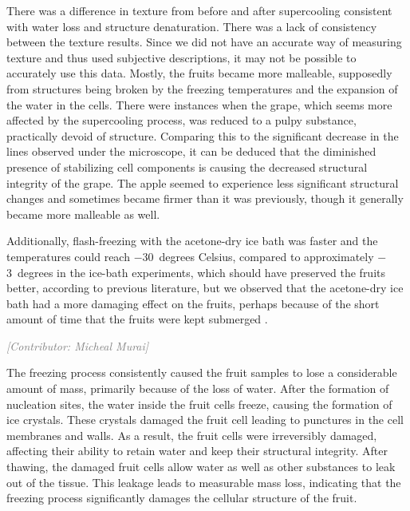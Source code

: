 \documentclass[12pt, a4paper]{article}
\newcommand{\contributor}[1]{\vspace{4pt}\noindent\textcolor{gray}{\small\textit{[Contributor: #1]}}\vspace{2pt}}
\begin{document}
There was a difference in texture from before and after supercooling
consistent with water loss and structure denaturation. There was a lack
of consistency between the texture results. Since we did not have an
accurate way of measuring texture and thus used subjective descriptions,
it may not be possible to accurately use this data. Mostly, the fruits
became more malleable, supposedly from structures being broken by the
freezing temperatures and the expansion of the water in the cells. There
were instances when the grape, which seems more affected by the
supercooling process, was reduced to a pulpy substance, practically
devoid of structure. Comparing this to the significant decrease in the
lines observed under the microscope, it can be deduced that the
diminished presence of stabilizing cell components is causing the
decreased structural integrity of the grape. The apple seemed to
experience less significant structural changes and sometimes became
firmer than it was previously, though it generally became more malleable
as well.

Additionally, flash-freezing with the acetone-dry ice bath was faster
and the temperatures could reach $-$30~degrees Celsius, compared to
approximately $-$3~degrees in the ice-bath experiments, which should have
preserved the fruits better, according to previous literature, but we
observed that the acetone-dry ice bath had a more damaging effect on the
fruits, perhaps because of the short amount of time that the fruits were
kept submerged \cite{narayana2023}.

\contributor{Micheal Murai}

The freezing process consistently caused the fruit samples to lose a
considerable amount of mass, primarily because of the loss of water.
After the formation of nucleation sites, the water inside the fruit
cells freeze, causing the formation of ice crystals. These crystals
damaged the fruit cell leading to punctures in the cell membranes and
walls. As a result, the fruit cells were irreversibly damaged, affecting
their ability to retain water and keep their structural integrity. After
thawing, the damaged fruit cells allow water as well as other substances
to leak out of the tissue. This leakage leads to measurable mass loss,
indicating that the freezing process significantly damages the cellular
structure of the fruit.

\end{document}
